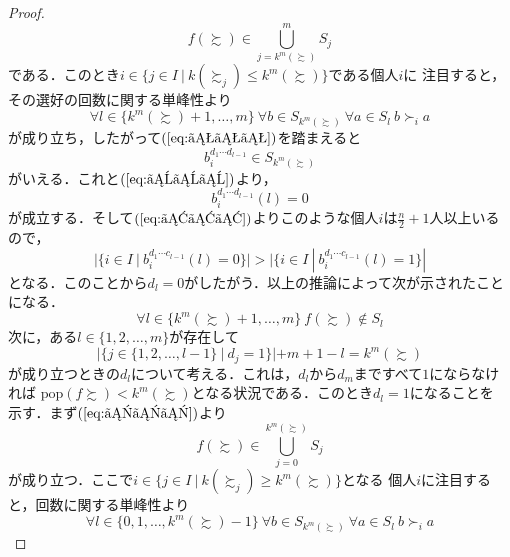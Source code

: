 \documentclass[dvipdfmx]{jsarticle}
\begin{document}
\begin{proof}
  \begin{equation}\label{eq:おおお}
    f(\succsim) \in \bigcup_{j=k^m(\succsim)}^{m}S_j
  \end{equation}
  である．このとき$i \in \{ j \in I \ | \ k(\succsim_j) \leq k^m(\succsim)\}$である個人$i$に
  注目すると，その選好の回数に関する単峰性より
  \begin{equation*}
    \forall l \in \{k^m(\succsim)+1, \ldots, m\} \ \forall b \in S_{k^m(\succsim)} \ 
    \forall a \in S_l \ b \succ_i a
  \end{equation*}
  が成り立ち，したがって$(\ref{eq:おおお})$を踏まえると
  \begin{equation*}
    b_{i}^{d_1 \cdots d_{l-1}} \in S_{k^m(\succsim)}
  \end{equation*}
  がいえる．これと$(\ref{eq:えええ})$より，
  \begin{equation*}
    b_{i}^{d_1 \cdots d_{l-1}}(l) = 0
  \end{equation*}
  が成立する．そして$(\ref{eq:あああ})$よりこのような個人$i$は$\frac{n}{2}+1$人以上いるので，
  \begin{equation*}
    |\{i \in I \ | \ b_i^{d_1 \cdots c_{l-1}}(l) = 0\}| >
    |\{i \in I \ | \ b_i^{d_1 \cdots c_{l-1}}(l) = 1\}|
  \end{equation*}
  となる．このことから$d_l=0$がしたがう．以上の推論によって次が示されたことになる．
  \begin{equation}\label{eq:ききき}
    \forall l \in \{k^m(\succsim)+1, \ldots, m\} \ f(\succsim) \notin S_l
  \end{equation}
  次に，ある$l \in \{1,2, \ldots, m\}$が存在して
  \begin{equation}\label{eq:かかか}
    |\{j \in \{1,2, \ldots, l-1\} \ | \ d_j=1 \}| + m + 1 -  l = k^m(\succsim)
  \end{equation}
  が成り立つときの$d_l$について考える．これは，$d_l$から$d_m$まですべて$1$にならなければ
  $\mathrm{pop}(f\succsim) < k^m(\succsim)$となる状況である．このとき$d_l=1$になることを
  示す．まず$(\ref{eq:かかか})$より
  \begin{equation}\label{eq:けけけ}
    f(\succsim) \in \bigcup_{j=0}^{k^m(\succsim)} S_j
  \end{equation}
  が成り立つ．ここで$i \in \{ j \in I \ | \ k(\succsim_j) \geq k^m(\succsim) \}$となる
  個人$i$に注目すると，回数に関する単峰性より
  \begin{equation*}
    \forall l \in \{0,1, \ldots, k^m(\succsim)-1\} \ \forall b \in S_{k^m(\succsim)} \ 
    \forall a \in S_l \ b \succ_i a
  \end{equation*}

\end{proof}
\end{document}
